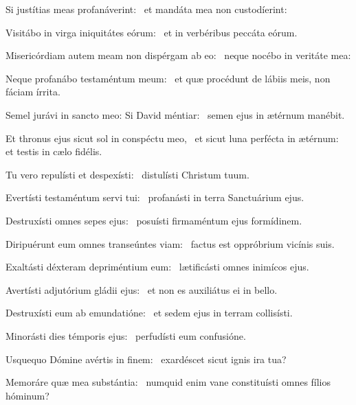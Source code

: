 \item Si justítias meas profanáve\-rint:~\psstar{} et mandáta mea non custodíerint:

\item Visitábo in virga iniquitátes eórum:~\psstar{} et in verbéribus peccáta eórum.

\item Misericórdiam autem meam non dispérgam ab eo:~\psstar{} neque nocébo in veritáte mea:

\item Neque profanábo testaméntum meum:~\psstar{} et quæ procédunt de lábiis meis, non fáciam írrita.

\item Semel jurávi in sancto meo: Si David méntiar:~\psstar{} semen ejus in ætérnum manébit.

\item Et thronus ejus sicut sol in conspéctu meo,~\pscross{} et sicut luna perfécta in ætérnum:~\psstar{} et testis in cælo fidélis.

\item Tu vero repulísti et despexísti:~\psstar{} distulísti Christum tuum.

\item Evertísti testaméntum servi tui:~\psstar{} profanásti in terra Sanctuárium ejus.

\item Destruxísti omnes sepes ejus:~\psstar{} posuísti firmaméntum ejus formídinem.

\item Diripuérunt eum omnes transeúntes viam:~\psstar{} factus est oppróbrium vicínis suis.

\item Exaltásti déxteram depriméntium eum:~\psstar{} lætificásti omnes inimícos ejus.

\item Avertísti adjutórium gládii ejus:~\psstar{} et non es auxiliátus ei in bello.

\item Destruxísti eum ab emundatióne:~\psstar{} et sedem ejus in terram collisísti.

\item Minorásti dies témporis ejus:~\psstar{} perfudísti eum confusióne.

\item Usquequo Dómine avértis in finem:~\psstar{} exardéscet sicut ignis ira tua?

\item Memoráre quæ mea substán\-tia:~\psstar{} numquid enim vane constituísti omnes fílios hóminum?


